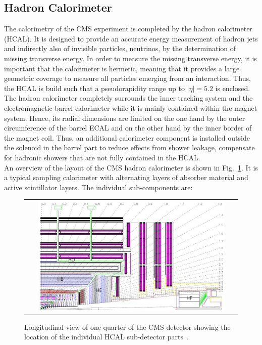 \subsection{Hadron Calorimeter}
\label{subsec:cms_hcal}
The calorimetry of the CMS experiment is completed by the hadron calorimeter (HCAL). It is designed to provide an accurate energy measurement of hadron jets and indirectly also of invisible particles, \eg neutrinos, by the determination of missing transverse energy. In order to measure the missing transverse energy, it is important that the calorimeter is hermetic, meaning that it provides a large geometric coverage to measure all particles emerging from an interaction. Thus, the HCAL is build such that a pseudorapidity range up to $|\eta| = 5.2$ is enclosed. \\ 
The hadron calorimeter completely surrounds the inner tracking system and the electromagnetic barrel calorimeter while it is mainly contained within the magnet system. Hence, its radial dimensions are limited on the one hand by the outer circumference of the barrel ECAL and on the other hand by the inner border of the magnet coil. Thus, an additional calorimeter component is installed outside the solenoid in the barrel part to reduce effects from shower leakage, \ie compensate for hadronic showers that are not fully contained in the HCAL. \\
An overview of the layout of the CMS hadron calorimeter is shown in Fig.~\ref{fig:CMS_hcal}. It is a typical sampling calorimeter with alternating layers of absorber material and active scintillator layers. The individual sub-components are:
\begin{figure}[!tp]
  \centering
  \begin{tabular}{c}
    \includegraphics[width=0.9\textwidth]{figures/Figures_Experimental_Apparatus_HCAL.png}
  \end{tabular}
  \caption{Longitudinal view of one quarter of the CMS detector showing the location of the individual HCAL sub-detector parts~\cite{Chatrchyan:2008zzk}.}
  \label{fig:CMS_hcal}
\end{figure}
